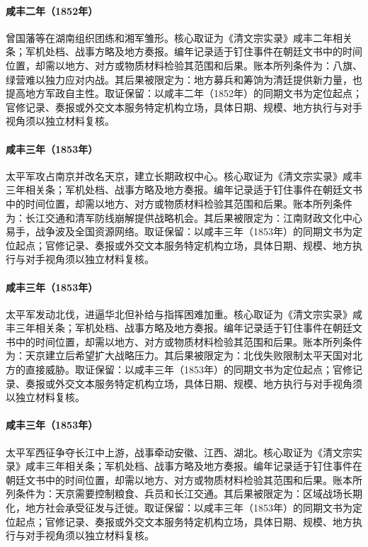 \hypertarget{ledger:EQ-1852-HUNAN-ARMY-ORIGINS}{}\paragraph{咸丰二年（1852年）}曾国藩等在湖南组织团练和湘军雏形。核心取证为《清文宗实录》咸丰二年相关条；军机处档、战事方略及地方奏报。编年记录适于钉住事件在朝廷文书中的时间位置，却需以地方、对方或物质材料检验其范围和后果。账本所列条件为：八旗、绿营难以独力应对内战。其后果被限定为：地方募兵和筹饷为清廷提供新力量，也提高地方军政自主性。取证保留：以咸丰二年（1852年）的同期文书为定位起点；官修记录、奏报或外交文本服务特定机构立场，具体日期、规模、地方执行与对手视角须以独立材料复核。
\hypertarget{ledger:EQ-1853-NANJING-TAKING}{}\paragraph{咸丰三年（1853年）}太平军攻占南京并改名天京，建立长期政权中心。核心取证为《清文宗实录》咸丰三年相关条；军机处档、战事方略及地方奏报。编年记录适于钉住事件在朝廷文书中的时间位置，却需以地方、对方或物质材料检验其范围和后果。账本所列条件为：长江交通和清军防线崩解提供战略机会。其后果被限定为：江南财政文化中心易手，战争波及全国资源网络。取证保留：以咸丰三年（1853年）的同期文书为定位起点；官修记录、奏报或外交文本服务特定机构立场，具体日期、规模、地方执行与对手视角须以独立材料复核。
\hypertarget{ledger:EQ-1853-NORTHERN-EXPEDITION}{}\paragraph{咸丰三年（1853年）}太平军发动北伐，进逼华北但补给与指挥困难加重。核心取证为《清文宗实录》咸丰三年相关条；军机处档、战事方略及地方奏报。编年记录适于钉住事件在朝廷文书中的时间位置，却需以地方、对方或物质材料检验其范围和后果。账本所列条件为：天京建立后希望扩大战略压力。其后果被限定为：北伐失败限制太平天国对北方的直接威胁。取证保留：以咸丰三年（1853年）的同期文书为定位起点；官修记录、奏报或外交文本服务特定机构立场，具体日期、规模、地方执行与对手视角须以独立材料复核。
\hypertarget{ledger:EQ-1853-WESTERN-EXPEDITION}{}\paragraph{咸丰三年（1853年）}太平军西征争夺长江中上游，战事牵动安徽、江西、湖北。核心取证为《清文宗实录》咸丰三年相关条；军机处档、战事方略及地方奏报。编年记录适于钉住事件在朝廷文书中的时间位置，却需以地方、对方或物质材料检验其范围和后果。账本所列条件为：天京需要控制粮食、兵员和长江交通。其后果被限定为：区域战场长期化，地方社会承受征发与迁徙。取证保留：以咸丰三年（1853年）的同期文书为定位起点；官修记录、奏报或外交文本服务特定机构立场，具体日期、规模、地方执行与对手视角须以独立材料复核。
